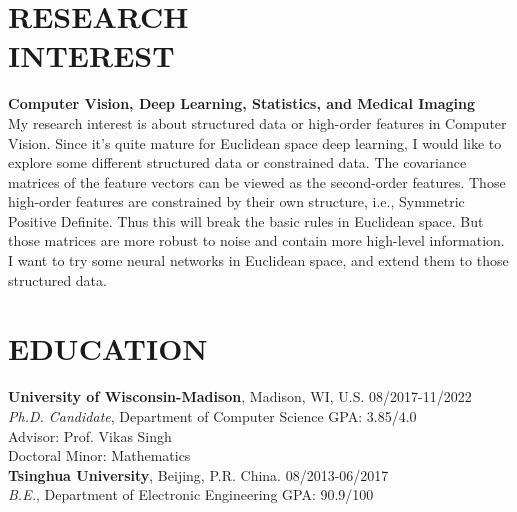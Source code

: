\documentclass[margin]{res}
\begin{document}
\begin{resume}
\vspace{-2em}
\section{RESEARCH \\ INTEREST}
                \textbf{Computer Vision, Deep Learning, Statistics, and Medical Imaging}\\
                My research interest is about structured data or high-order features in Computer Vision. Since it's quite mature for Euclidean space deep learning, I would like to explore some different structured data or constrained data. The covariance matrices of the feature vectors can be viewed as the second-order features. Those high-order features are constrained by their own structure, i.e., Symmetric Positive Definite. Thus this will break the basic rules in Euclidean space. But those matrices are more robust to noise and contain more high-level information. I want to try some neural networks in Euclidean space, and extend them to those structured data. 
                
\vspace{-1em}
\section{EDUCATION} 
                {\bf University of Wisconsin-Madison}, Madison, WI, U.S. \hfill 08/2017-11/2022\\
                {\sl {Ph.D. Candidate}}, Department of Computer Science \hfill GPA: 3.85/4.0\\
                {Advisor:} Prof. Vikas Singh\\
                {Doctoral Minor:} Mathematics\\
                {\bf Tsinghua University}, Beijing, P.R. China. \hfill 08/2013-06/2017\\
                {\sl {B.E.}}, Department of Electronic Engineering \hfill GPA: 90.9/100

\vspace{-1em}                

\end{resume}
\end{document}
